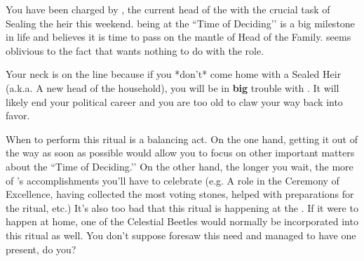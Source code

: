 \documentclass[green]{GL2020}
\begin{document}
\name{\gSealingFaledonHeir{}}

You have been charged by \cFaledonParent{\full}, the current head of the \cFaledonParent{\formal} with the crucial task of Sealing the \cFaledonParent{\formal} heir this weekend. \cHeir{} being at the ``Time of Deciding’’ is a big milestone in \cHeir{\their} life and \cFaledonParent{} believes it is time to pass on the mantle of Head of the Family. \cFaledonParent{} seems oblivious to the fact that \cHeir{} wants nothing to do with the role.

Your neck is on the line because if you *don’t* come home with a Sealed Heir (a.k.a. A new head of the \cFaledonParent{\formal} household), you will be in \textbf{big} trouble with \cFaledonParent{}. It will likely end your political career and you are too old to claw your way back into favor.

When to perform this ritual is a balancing act. On the one hand, getting it out of the way as soon as possible would allow you to focus on other important matters about the ``Time of Deciding.’’ On the other hand, the longer you wait, the more of \cHeir{}'s accomplishments you'll have to celebrate (e.g. A role in the Ceremony of Excellence, having collected the most voting stones, helped with preparations for the ritual, etc.) It’s also too bad that this ritual is happening at the \pSchool{}. If it were to happen at home, one of the Celestial Beetles would normally be incorporated into this ritual as well. You don’t suppose \cTechGod{} foresaw this need and managed to have one present, do you?
\end{document}
